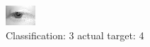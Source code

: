 \begin{figure}[h!]
\begin{center}
\includegraphics[width=0.60\columnwidth]{figures/ID2703_class_3_target_4.png}
\end{center}
\caption{ Classification: 3 actual target: 4}
\label{fig:ID2703_class_3_target_4}
\end{figure}
